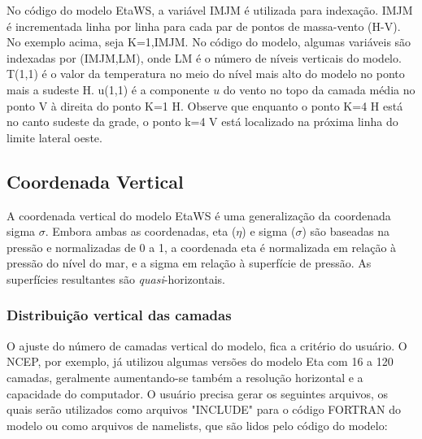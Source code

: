 No código do modelo EtaWS, a variável IMJM é utilizada para indexação. IMJM é incrementada linha por linha para cada par de pontos de massa-vento (H-V). No exemplo acima, seja K=1,IMJM. No código do modelo, algumas variáveis são indexadas por (IMJM,LM), onde LM é o número de níveis verticais do modelo. T(1,1) é o valor da temperatura no meio do nível mais alto do modelo no ponto mais a sudeste H. u(1,1) é a componente $u$ do vento no topo da camada média no ponto V à direita do ponto K=1 H. Observe que enquanto o ponto K=4 H está no canto sudeste da grade, o ponto k=4 V está localizado na próxima linha do limite lateral oeste.

\subsection{Coordenada Vertical}
\label{ss:coordenadavertical}

A coordenada vertical do modelo EtaWS é uma generalização da coordenada sigma $\sigma$. Embora ambas as coordenadas, eta ($\eta$) e sigma ($\sigma$) são baseadas na pressão e normalizadas de 0 a 1, a coordenada eta é normalizada em relação à pressão do nível do mar, e a sigma em relação à superfície de pressão. As superfícies resultantes são \textit{quasi}-horizontais.

\subsubsection{Distribuição vertical das camadas}

O ajuste do número de camadas vertical do modelo, fica a critério do usuário. O NCEP, por exemplo, já utilizou algumas versões do modelo Eta com 16 a 120 camadas, geralmente aumentando-se também a resolução horizontal e a capacidade do computador. O usuário precisa gerar os seguintes arquivos, os quais serão utilizados como arquivos "INCLUDE" para o código FORTRAN do modelo ou como arquivos de namelists, que são lidos pelo código do modelo:


